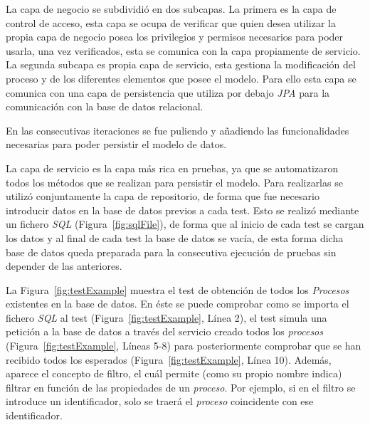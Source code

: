 La capa de negocio se subdividió en dos subcapas. La primera es la capa de control de acceso, esta capa se ocupa de verificar que quien desea utilizar la propia capa de negocio posea los privilegios y permisos necesarios para poder usarla, una vez verificados, esta se comunica con la capa propiamente de servicio. La segunda subcapa es propia capa de servicio, esta gestiona la modificación del proceso y de los diferentes elementos que posee el modelo. Para ello esta capa se comunica con una capa de persistencia que utiliza por debajo \emph{JPA} para la comunicación con la base de datos relacional.



En las consecutivas iteraciones se fue puliendo y añadiendo las funcionalidades necesarias para poder persistir el modelo de datos.


La capa de servicio es la capa más rica en pruebas, ya que se automatizaron todos los métodos que se realizan para persistir el modelo. Para realizarlas se utilizó conjuntamente la capa de repositorio, de forma que fue necesario introducir datos en la base de datos previos a cada test. Esto se realizó mediante un fichero \emph{SQL} (Figura~\ref{fig:sqlFile}), de forma que al inicio de cada test se cargan los datos y al final de cada test la base de datos se vacía, de esta forma dicha base de datos queda preparada para la consecutiva ejecución de pruebas sin depender de las anteriores.

La Figura~\ref{fig:testExample} muestra el test de obtención de todos los \emph{Procesos} existentes en la base de datos. En éste se puede comprobar como se importa el fichero \emph{SQL} al test (Figura~\ref{fig:testExample}, Línea 2), el test simula una petición a la base de datos a través del servicio creado todos los \emph{procesos} (Figura~\ref{fig:testExample}, Líneas 5-8) para posteriormente comprobar que se han recibido todos los esperados (Figura~\ref{fig:testExample}, Línea 10). Además, aparece el concepto de filtro, el cuál permite (como su propio nombre indica) filtrar en función de las propiedades de un \emph{proceso}. Por ejemplo, si en el filtro se introduce un identificador, solo se traerá el \emph{proceso} coincidente con ese identificador.

